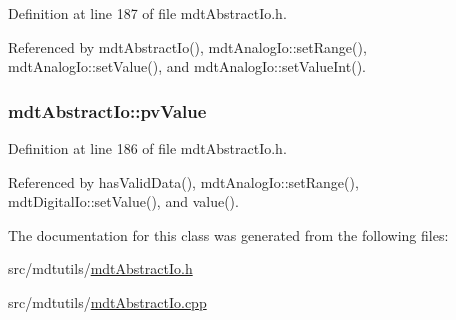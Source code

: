 Definition at line 187 of file mdt\-Abstract\-Io.\-h.



Referenced by mdt\-Abstract\-Io(), mdt\-Analog\-Io\-::set\-Range(), mdt\-Analog\-Io\-::set\-Value(), and mdt\-Analog\-Io\-::set\-Value\-Int().

\hypertarget{classmdt_abstract_io_ab955fdb5b2f6491917670a84752b823f}{
\subsubsection[{pv\-Value}]{ mdt\-Abstract\-Io\-::pv\-Value\hspace{0.3cm}{\ttfamily [protected]}}}\label{classmdt_abstract_io_ab955fdb5b2f6491917670a84752b823f}


Definition at line 186 of file mdt\-Abstract\-Io.\-h.



Referenced by has\-Valid\-Data(), mdt\-Analog\-Io\-::set\-Range(), mdt\-Digital\-Io\-::set\-Value(), and value().



The documentation for this class was generated from the following files\-:\begin{DoxyCompactItemize}
\item 
src/mdtutils/\hyperlink{mdt_abstract_io_8h}{mdt\-Abstract\-Io.\-h}\item 
src/mdtutils/\hyperlink{mdt_abstract_io_8cpp}{mdt\-Abstract\-Io.\-cpp}\end{DoxyCompactItemize}
